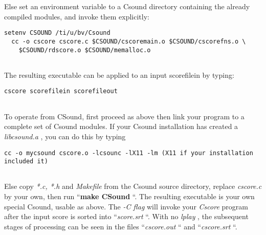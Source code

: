  
 Else set an environment variable to a Csound directory containing the already compiled modules, and invoke them explicitly: 

 
\begin{lstlisting}
setenv CSOUND /ti/u/bv/Csound
  cc -o cscore cscore.c $CSOUND/cscoremain.o $CSOUND/cscorefns.o \
    $CSOUND/rdscore.o $CSOUND/memalloc.o
      
\end{lstlisting}


 


  The resulting executable can be applied to an input scorefilein by typing: 


 
\begin{lstlisting}
cscore scorefilein scorefileout
      
\end{lstlisting}


 


  To operate from CSound, first proceed as above then link your program to a complete set of Csound\emph{ }
modules. If your Csound installation has created a \emph{libcsound.a}
, you can do this by typing 


 
\begin{lstlisting}
cc -o mycsound cscore.o -lcsounc -lX11 -lm (X11 if your installation included it)
      
\end{lstlisting}


 
 Else copy \emph{*.c, *.h}
 and \emph{Makefile}
 from the Csound source directory, replace \emph{cscore.c}
 by your own, then run ``\textbf{make CSound}
``. The resulting executable is your own special Csound, usable as above. The \emph{-C flag}
 will invoke your \emph{Cscore}
 program after the input score is sorted into ``\emph{score.srt}
``. With no \emph{lplay}
, the subsequent stages of processing can be seen in the files ``\emph{cscore.out}
`` and ``\emph{cscore.srt}
``. %


\begin{comment}
\begin{tabular}{lcr}
Previous &Home &Next \\
More Advanced Examples &Up &Adding your own Cmodules to Csound

\end{tabular}



\end{comment}
